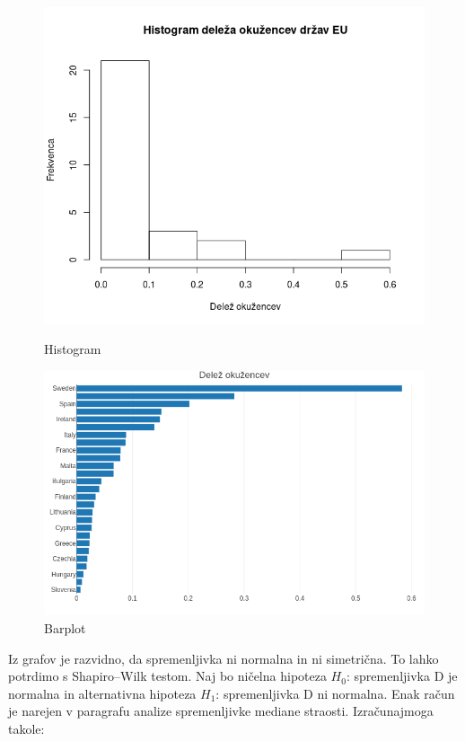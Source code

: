 \documentclass[a4paper,11pt]{article}
\begin{document}
\begin{figure}[!htb]
   \begin{minipage}{0.5\textwidth}
     \centering
     \includegraphics[width=1\linewidth]{histogram_delez_okuzenih}
     \caption{Histogram}\label{Fig:Data1}
   \end{minipage}\hfill
   \begin{minipage}{0.5\textwidth}
     \centering
     \includegraphics[width=1\linewidth]{barplot_delez_okuzenih}
     \caption{Barplot}\label{Fig:Data2}
   \end{minipage}
\end{figure}
Iz grafov je razvidno, da spremenljivka ni normalna in ni simetrična. To lahko potrdimo s Shapiro–Wilk testom. Naj bo ničelna hipoteza \(H_0\): spremenljivka D je normalna in alternativna hipoteza \(H_1\): spremenljivka D ni normalna. Enak račun je narejen v paragrafu analize spremenljivke mediane straosti. Izračunajmoga takole:
\end{document}
